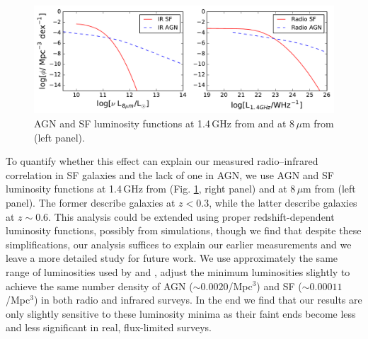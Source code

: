 \documentclass{emulateapj}
\begin{document}
\begin{figure}[h]
\centering
\includegraphics[width=6in]{images/sim_rad_ir_luminosity_functions.pdf}
\caption{AGN and SF luminosity functions at 1.4\,GHz from \citet{mauch07} and at 8\,$\mu$m from \citet{fu10} (left panel).}
\label{fig:luminosityfunctions}
\end{figure}

To quantify whether this effect can explain our measured radio--infrared correlation in SF galaxies and the lack of one in AGN, we use AGN and SF luminosity functions at 1.4\,GHz from \citet{mauch07} (Fig. \ref{fig:luminosityfunctions}, right panel) and at 8\,$\mu$m from \citet{fu10} (left panel). The former describe galaxies at $z<0.3$, while the latter describe galaxies at $z\sim0.6$. This analysis could be extended using proper redshift-dependent luminosity functions, possibly from simulations, though we find that despite these simplifications, our analysis suffices to explain our earlier measurements and we leave a more detailed study for future work. We use approximately the same range of luminosities used by \citet{mauch07} and \citet{fu10}, adjust the minimum luminosities slightly to achieve the same number density of AGN ($\sim0.0020$/Mpc$^3$) and SF ($\sim0.00011$/Mpc$^3$) in both radio and infrared surveys. In the end we find that our results are only slightly sensitive to these luminosity minima as their faint ends become less and less significant in real, flux-limited surveys. 
\end{document}
